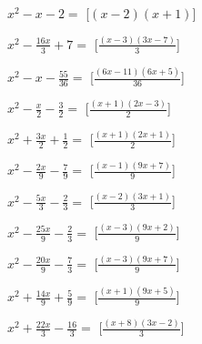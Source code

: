 \begin{esercizio}
\begin{multicols}{2}
\begin{enumeratea}

\item \(x^{2} - x - 2=\) 
\hfill [\(\left(x - 2\right) \left(x + 1\right)\)]
\item \(x^{2} - \frac{16 x}{3} + 7=\) 
\hfill [\(\frac{\left(x - 3\right) \left(3 x - 7\right)}{3}\)]
\item \(x^{2} - x - \frac{55}{36}=\) 
\hfill [\(\frac{\left(6 x - 11\right) \left(6 x + 5\right)}{36}\)]
\item \(x^{2} - \frac{x}{2} - \frac{3}{2}=\) 
\hfill [\(\frac{\left(x + 1\right) \left(2 x - 3\right)}{2}\)]
\item \(x^{2} + \frac{3 x}{2} + \frac{1}{2}=\) 
\hfill [\(\frac{\left(x + 1\right) \left(2 x + 1\right)}{2}\)]
\item \(x^{2} - \frac{2 x}{9} - \frac{7}{9}=\) 
\hfill [\(\frac{\left(x - 1\right) \left(9 x + 7\right)}{9}\)]
\item \(x^{2} - \frac{5 x}{3} - \frac{2}{3}=\) 
\hfill [\(\frac{\left(x - 2\right) \left(3 x + 1\right)}{3}\)]
\item \(x^{2} - \frac{25 x}{9} - \frac{2}{3}=\) 
\hfill [\(\frac{\left(x - 3\right) \left(9 x + 2\right)}{9}\)]
\item \(x^{2} - \frac{20 x}{9} - \frac{7}{3}=\) 
\hfill [\(\frac{\left(x - 3\right) \left(9 x + 7\right)}{9}\)]
\item \(x^{2} + \frac{14 x}{9} + \frac{5}{9}=\) 
\hfill [\(\frac{\left(x + 1\right) \left(9 x + 5\right)}{9}\)]
\item \(x^{2} + \frac{22 x}{3} - \frac{16}{3}=\) 
\hfill [\(\frac{\left(x + 8\right) \left(3 x - 2\right)}{3}\)]

\end{enumeratea}
\end{multicols}
\end{esercizio}
